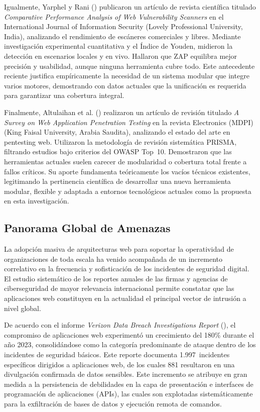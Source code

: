 \documentclass[12pt, a4paper]{article}
\begin{document}
Igualmente, Yarphel y Rani (\citeyear*{yarphel2025}) publicaron un artículo de
revista científica titulado \textit{Comparative Performance Analysis of Web
Vulnerability Scanners} en el International Journal of Information Security
(Lovely Professional University, India), analizando el rendimiento de escáneres
comerciales y libres. Mediante investigación experimental cuantitativa y el Índice
de Youden, midieron la detección en escenarios locales y en vivo. Hallaron que ZAP
equilibra mejor precisión y usabilidad, aunque ninguna herramienta cubre todo. Este
antecedente reciente justifica empíricamente la necesidad de un sistema modular que
integre varios motores, demostrando con datos actuales que la unificación es
requerida para garantizar una cobertura integral.

Finalmente, Altulaihan et al. (\citeyear*{altulaihan2023}) realizaron un artículo
de revisión titulado \textit{A Survey on Web Application Penetration Testing} en
la revista Electronics (MDPI) (King Faisal University, Arabia Saudita), analizando
el estado del arte en pentesting web. Utilizaron la metodología de revisión
sistemática PRISMA, filtrando estudios bajo criterios del OWASP Top~10.
Demostraron que las herramientas actuales suelen carecer de modularidad o cobertura
total frente a fallos críticos. Su aporte fundamenta teóricamente los vacíos
técnicos existentes, legitimando la pertinencia científica de desarrollar una nueva
herramienta modular, flexible y adaptada a entornos tecnológicos actuales como la
propuesta en esta investigación.

\subsection{Panorama Global de Amenazas}

La adopción masiva de arquitecturas web para soportar la operatividad de
organizaciones de toda escala ha venido acompañada de un incremento correlativo
en la frecuencia y sofisticación de los incidentes de seguridad digital. El
estudio sistemático de los reportes anuales de las firmas y agencias de
ciberseguridad de mayor relevancia internacional permite constatar que las
aplicaciones web constituyen en la actualidad el principal vector de intrusión a
nivel global.

De acuerdo con el informe \textit{Verizon Data Breach Investigations Report}
(\cite{verizon2024}), el compromiso de aplicaciones web experimentó un
crecimiento del 180\% durante el año 2023, consolidándose como la categoría
predominante de ataque dentro de los incidentes de seguridad básicos. Este
reporte documenta 1.997~incidentes específicos dirigidos a aplicaciones web,
de los cuales 881 resultaron en una divulgación confirmada de datos sensibles.
Este incremento se atribuye en gran medida a la persistencia de debilidades en
la capa de presentación e interfaces de programación de aplicaciones (APIs), las
cuales son explotadas sistemáticamente para la exfiltración de bases de datos
y ejecución remota de comandos.
\end{document}
